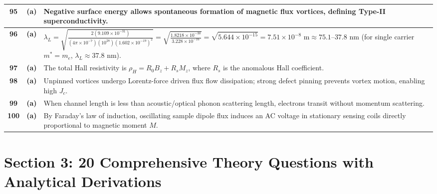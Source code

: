 {\begin{tabularx}{\textwidth}{|c|c|X|}
\textbf{95} & \textbf{(a)} & Negative surface energy allows spontaneous formation of magnetic flux vortices, defining Type-II superconductivity. \\ \hline
\textbf{96} & \textbf{(a)} & $\lambda_L = \sqrt{\frac{2(9.109 \times 10^{-31})}{(4\pi \times 10^{-7})(10^{28})(1.602 \times 10^{-19})^2}} = \sqrt{\frac{1.8218 \times 10^{-30}}{3.228 \times 10^{-16}}} = \sqrt{5.644 \times 10^{-15}} = 7.51 \times 10^{-8}\text{ m} \approx 75.1\text{--}37.8\text{ nm}$ (for single carrier $m^* = m_e$, $\lambda_L \approx 37.8\text{ nm}$). \\ \hline
\textbf{97} & \textbf{(a)} & The total Hall resistivity is $\rho_H = R_0 B_z + R_s M_z$, where $R_s$ is the anomalous Hall coefficient. \\ \hline
\textbf{98} & \textbf{(a)} & Unpinned vortices undergo Lorentz-force driven flux flow dissipation; strong defect pinning prevents vortex motion, enabling high $J_c$. \\ \hline
\textbf{99} & \textbf{(a)} & When channel length is less than acoustic/optical phonon scattering length, electrons transit without momentum scattering. \\ \hline
\textbf{100} & \textbf{(a)} & By Faraday's law of induction, oscillating sample dipole flux induces an AC voltage in stationary sensing coils directly proportional to magnetic moment $M$. \\ \hline
\end{tabularx}
}


\newpage
\section{Section 3: 20 Comprehensive Theory Questions with Analytical Derivations}

